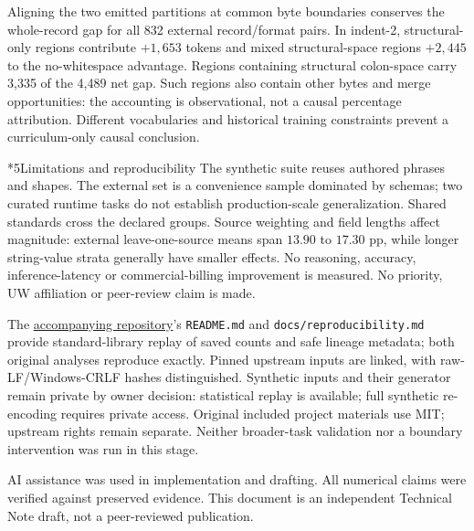 \documentclass[10pt,a4paper]{article}
\makeatletter
\renewcommand\section{\@startsection{section}{1}{0pt}{1.5ex plus .3ex minus .1ex}{.6ex plus .1ex}{\normalfont\normalsize\bfseries}}
\makeatother
\begin{document}
Aligning the two emitted partitions at common byte boundaries conserves the
whole-record gap for all 832 external record/format pairs.
In indent-2, structural-only regions contribute \(+1{,}653\) tokens and
mixed structural-space regions \(+2{,}445\) to the no-whitespace advantage.
Regions containing structural colon-space carry 3,335 of the 4,489 net
gap. Such regions also contain other bytes and merge opportunities:
the accounting is observational, not a causal percentage attribution.
Different vocabularies and historical training constraints prevent a
curriculum-only causal conclusion.

\section*{\normalsize 5\quad Limitations and reproducibility}
The synthetic suite reuses authored phrases and shapes. The external set
is a convenience sample dominated by schemas; two curated runtime tasks
do not establish production-scale generalization. Shared standards cross
the declared groups. Source weighting and field lengths affect magnitude:
external leave-one-source means span \(13.90\) to \(17.30\) pp, while
longer string-value strata generally have smaller effects.
No reasoning, accuracy, inference-latency or commercial-billing improvement
is measured. No priority, UW affiliation or peer-review claim is made.

The \href{https://github.com/ZhijingWu/superbpe-serialization-evaluation}{accompanying repository}'s \texttt{README.md} and
\texttt{docs/reproducibility.md} provide standard-library replay of saved
counts and safe lineage metadata; both original analyses reproduce exactly.
Pinned upstream inputs are linked, with raw-LF/Windows-CRLF hashes distinguished.
Synthetic inputs and their generator remain private by owner decision:
statistical replay is available; full synthetic re-encoding requires private access.
Original included project materials use MIT; upstream rights remain separate.
Neither broader-task validation nor a boundary intervention was run in this stage.

{\footnotesize AI assistance was used in implementation and drafting.
All numerical claims were verified against preserved evidence.
This document is an independent Technical Note draft, not a peer-reviewed publication.}
\end{document}
